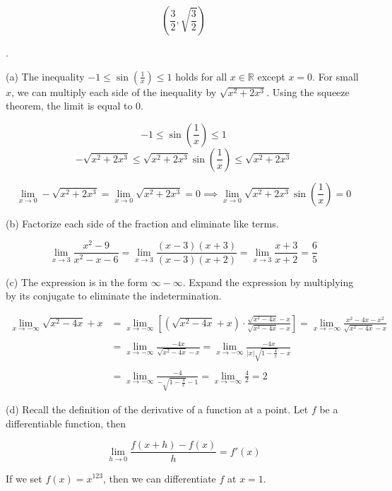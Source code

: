 \documentclass{article}
\begin{document}
\[\boxed{\left(\frac32,\sqrt{\frac32}\right)}\]

\newpage

.

\hfill

\noindent (a) The inequality $\displaystyle-1 \leq \sin\left(\frac1x\right)\leq1$ holds for all $x\in\mathbb{R}$ except $x=0$. For small $x$, we can multiply each side of the inequality by $\sqrt{x^2+2x^3}$. Using the squeeze theorem, the limit is equal to $0$.

\[-1\leq\sin\left(\frac1x\right)\leq1\]
\[-\sqrt{x^2+2x^3}\leq\sqrt{x^2+2x^3}\sin\left(\frac1x\right)\leq\sqrt{x^2+2x^3}\]

\[\lim_{x\to0}-\sqrt{x^2+2x^3}=\lim_{x\to0}\sqrt{x^2+2x^3}=0\implies\lim_{x\to0}\sqrt{x^2+2x^3}\sin\left(\frac1x\right)=\boxed0\]

\hfill

\noindent (b) Factorize each side of the fraction and eliminate like terms.

\[\lim_{x\to3}\frac{x^2-9}{x^2-x-6}=\lim_{x\to3}\frac{(x-3)(x+3)}{(x-3)(x+2)}=\lim_{x\to3}\frac{x+3}{x+2}=\boxed{\frac65}\]

\hfill

\noindent (c) The expression is in the form $\infty-\infty$. Expand the expression by multiplying by its conjugate to eliminate the indetermination.

\begin{align*}
\lim_{x\to-\infty}\sqrt{x^2-4x}+x&=\lim_{x\to-\infty}\left[\left(\sqrt{x^2-4x} + x\right) \cdot\frac{\sqrt{x^2-4x}-x}{\sqrt{x^2-4x}-x}\right]=\lim_{x\to-\infty}\frac{x^2-4x-x^2}{\sqrt{x^2-4x}-x}\\\\&=\lim_{x\to-\infty}\frac{-4x}{\sqrt{x^2-4x}-x}=\lim_{x\to-\infty}\frac{-4x}{\displaystyle |x|\sqrt{1-\frac4x}-x}\\\\&=\lim_{x\to-\infty}\frac{-4}{\displaystyle-\sqrt{1-\frac4x}-1}=\lim_{x\to-\infty}\frac42=\boxed{2}\end{align*}

\hfill

\noindent (d) Recall the definition of the derivative of a function at a point. Let $f$ be a differentiable function, then

\[\lim_{h\to 0} \frac{f(x+h)-f(x)}{h} = f'(x)\]

\hfill

\noindent If we set $f(x) = x^{123}$, then we can differentiate $f$ at $x=1$.
\end{document}
